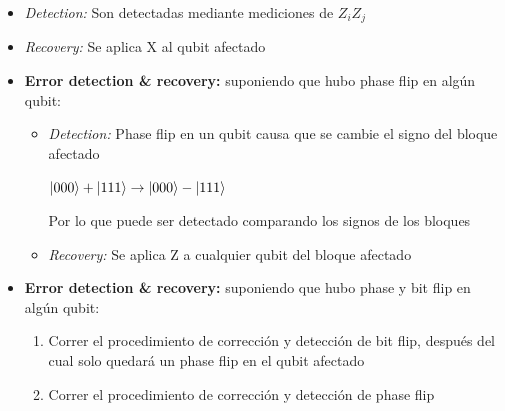\documentclass[10pt]{beamer}
\theoremstyle{remark}
\theoremstyle{definition}
\begin{document}
\begin{frame}[allowframebreaks]
\begin{itemize}
        \begin{itemize}
            \item \textit{Detection:} Son detectadas mediante mediciones de $Z_iZ_j$
            \item \textit{Recovery:} Se aplica X al qubit afectado
        \end{itemize}
    \end{itemize}

    \framebreak

    \begin{itemize}
        \item \textbf{Error detection \& recovery:} suponiendo que hubo phase flip en algún qubit:
    
        \vspace{0.4cm}

        \begin{itemize}
            \item \textit{Detection:} Phase flip en un qubit causa que se cambie el signo del bloque afectado
            
            $\ket{000} + \ket{111} \rightarrow \ket{000} - \ket{111}$

            Por lo que puede ser detectado comparando los signos de los bloques %

            \item \textit{Recovery:} Se aplica Z a cualquier qubit del bloque afectado
        \end{itemize}
    \end{itemize}

    \framebreak

    \begin{itemize}
        \item \textbf{Error detection \& recovery:} suponiendo que hubo phase y bit flip en algún qubit:
    
        \vspace{0.4cm}

        \begin{enumerate}
            \item Correr el procedimiento de corrección y detección de bit flip, después del cual solo quedará un phase flip en el qubit afectado
            \item Correr el procedimiento de corrección y detección de phase flip
        \end{enumerate}
    \end{itemize}


\end{frame}
\end{document}
